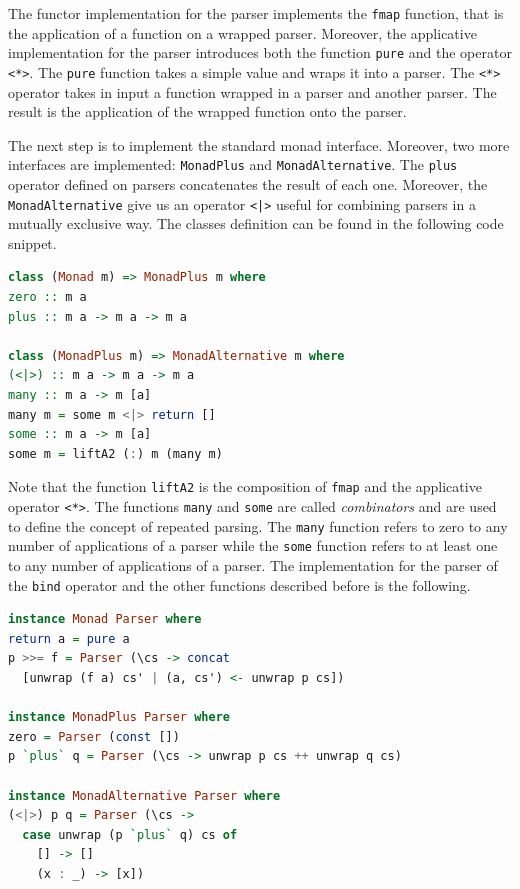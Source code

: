 \documentclass[12pt,a4paper]{article}
\begin{document}
The functor implementation for the parser implements the \texttt{fmap} function, that is the application of a function on a wrapped parser.
Moreover, the applicative implementation for the parser introduces both the function \texttt{pure} and the operator \texttt{<*>}.
The \texttt{pure} function takes a simple value and wraps it into a parser.
The \texttt{<*>} operator takes in input a function wrapped in a parser and another parser.
The result is the application of the wrapped function onto the parser.

The next step is to implement the standard monad interface.
Moreover, two more interfaces are implemented: \texttt{MonadPlus} and \texttt{MonadAlternative}.
The \texttt{plus} operator defined on parsers concatenates the result of each one.
Moreover, the \texttt{MonadAlternative} give us an operator \texttt{<|>} useful for combining parsers in a mutually exclusive way.
The classes definition can be found in the following code snippet.
\begin{lstlisting}[language=Haskell, style=custom-style]
class (Monad m) => MonadPlus m where
zero :: m a
plus :: m a -> m a -> m a

class (MonadPlus m) => MonadAlternative m where
(<|>) :: m a -> m a -> m a
many :: m a -> m [a]
many m = some m <|> return []
some :: m a -> m [a]
some m = liftA2 (:) m (many m)
\end{lstlisting}
Note that the function \texttt{liftA2} is the composition of \texttt{fmap} and the applicative operator \texttt{<*>}.
The functions \texttt{many} and \texttt{some} are called \textit{combinators} and are used to define the concept of repeated parsing.
The \texttt{many} function refers to zero to any number of applications of a parser while the \texttt{some} function refers to at least one to any number of applications of a parser.
The implementation for the parser of the \texttt{bind} operator and the other functions described before is the following.
\begin{lstlisting}[language=Haskell, style=custom-style]
instance Monad Parser where
return a = pure a
p >>= f = Parser (\cs -> concat
  [unwrap (f a) cs' | (a, cs') <- unwrap p cs])

instance MonadPlus Parser where
zero = Parser (const [])
p `plus` q = Parser (\cs -> unwrap p cs ++ unwrap q cs)

instance MonadAlternative Parser where
(<|>) p q = Parser (\cs ->
  case unwrap (p `plus` q) cs of
    [] -> []
    (x : _) -> [x])
\end{lstlisting}
\end{document}
